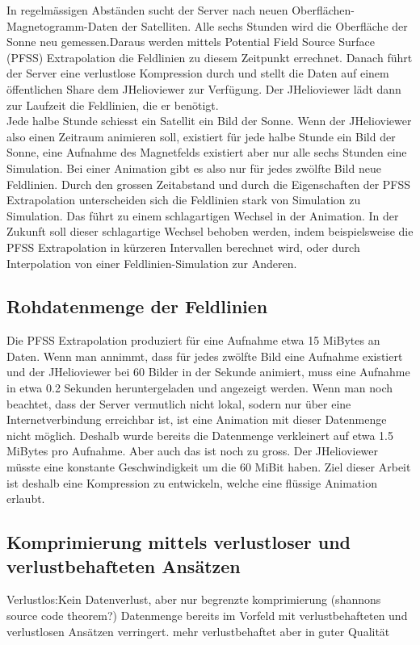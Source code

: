 In regelmässigen Abständen sucht der Server nach neuen Oberflächen-Magnetogramm-Daten der Satelliten. Alle sechs Stunden wird die Oberfläche der Sonne neu gemessen.Daraus werden mittels Potential Field Source Surface (PFSS) Extrapolation die Feldlinien zu diesem Zeitpunkt errechnet. Danach führt der Server eine verlustlose Kompression durch und stellt die Daten auf einem öffentlichen Share dem JHelioviewer zur Verfügung. Der JHelioviewer lädt dann zur Laufzeit die Feldlinien, die er benötigt.\\[\baselineskip]
Jede halbe Stunde schiesst ein Satellit ein Bild der Sonne. Wenn der JHelioviewer also einen Zeitraum animieren soll, existiert für jede halbe Stunde ein Bild der Sonne, eine Aufnahme des Magnetfelds existiert aber nur alle sechs Stunden eine Simulation. Bei einer Animation gibt es also nur für jedes zwölfte Bild neue Feldlinien. Durch den grossen Zeitabstand und durch die Eigenschaften der PFSS Extrapolation unterscheiden sich die Feldlinien stark von Simulation zu Simulation. Das führt zu einem schlagartigen Wechsel in der Animation. In der Zukunft soll dieser schlagartige Wechsel behoben werden, indem beispielsweise die PFSS Extrapolation in kürzeren Intervallen berechnet wird, oder durch Interpolation von einer Feldlinien-Simulation zur Anderen.

\subsection{Rohdatenmenge der Feldlinien}
Die PFSS Extrapolation produziert für eine Aufnahme etwa 15 MiBytes an Daten. Wenn man annimmt, dass für jedes zwölfte Bild eine Aufnahme existiert und der JHelioviewer bei 60 Bilder in der Sekunde animiert, muss eine Aufnahme in etwa 0.2 Sekunden heruntergeladen und angezeigt werden. Wenn man noch beachtet, dass der Server vermutlich nicht lokal, sodern nur über eine Internetverbindung erreichbar ist, ist eine Animation mit dieser Datenmenge nicht möglich. Deshalb wurde bereits die Datenmenge verkleinert auf etwa 1.5 MiBytes pro Aufnahme. Aber auch das ist noch zu gross. Der JHelioviewer müsste eine konstante Geschwindigkeit um die 60 MiBit haben. Ziel dieser Arbeit ist deshalb eine Kompression zu entwickeln, welche eine flüssige Animation erlaubt.

\subsection{Komprimierung mittels verlustloser und verlustbehafteten Ansätzen}
Verlustlos:Kein Datenverlust, aber nur begrenzte komprimierung (shannons source code theorem?)
Datenmenge bereits im Vorfeld  mit verlustbehafteten und verlustlosen Ansätzen verringert.
mehr verlustbehaftet aber in guter Qualität


 